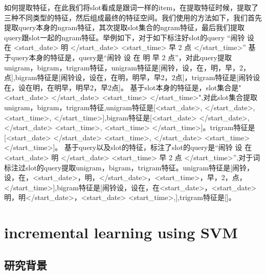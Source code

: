 \documentclass[master]{njuthesis}
\begin{document}
    如何提取特征，在此我们将slot看成是跟词一样的item，在提取特征时候，提取了三种不同类型的特征，然后组成最终的特征空间。我们使用的方法如下，我们首先提取query本身的ngram特征，其次提取slot集合的ngram特征，最后我们提取query跟slot一起的ngram特征。举例如下，对于如下标注好slot的query
“闹铃 设 在 <start\_date> 明 </start\_date> <start\_time>  早 2 点 </start\_time>”
    基于query本身的特征是，query是“闹铃 设 在 明 早 2 点”，对此query提取unigram，bigram，trigram特征，unigram特征是[闹铃，设，在，明，早，2，点],bigram特征是[闹铃设，设在，在明，明早，早2，2点]，trigram特征是[闹铃设在，设在明，在明早，明早2，早2点]。
    基于slot本身的特征是，slot集合是"<start\_date> </start\_date> <start\_time> </start\_time>",对此slot集合提取unigram，bigram，trigram特征,unigram特征是[<start\_date>, </start\_date>, <start\_time>, </start\_time>],bigram特征是[<start\_date> </start\_date>, </start\_date> <start\_time>, <start\_time> </start\_time>]。trigram特征是[<start\_date> </start\_date> <start\_time>, </start\_date> <start\_time> </start\_time>]。
    基于query以及slot的特征，标注了slot的query是“闹铃 设 在 <start\_date> 明 </start\_date> <start\_time> 早 2 点 </start\_time>”,对于词标注过slot的query提取unigram，bigram，trigram特征。unigram特征是[闹铃，设，在，<start\_date>，明，</start\_date>，<start\_time>，早，2，点，</start\_time>],bigram特征是[闹铃设，设在，在<start\_date>，<start\_date>明，明</start\_date>，<start\_date> <start\_time>,],trigram特征是[]。

\chapter{incremental learning using SVM}\label{chapter_smallworld}

\section{研究背景}
\end{document}
